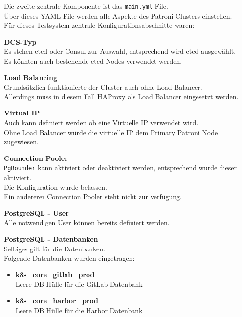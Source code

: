 \begin{flushleft}
    Die zweite zentrale Komponente ist das \texttt{main.yml}-File.\\
    Über dieses YAML-File werden alle Aspekte des Patroni-Clusters einstellen.\\
    Für dieses Testsystem zentrale Konfigurationsabschnitte waren:
    \begin{description}
        \item \textbf{\Gls{DCS}-Typ}\hfill \\Es stehen \gls{etcd} oder \Gls{Consul} zur Auswahl, entsprechend wird \gls{etcd} ausgewählt.\\Es könnten auch bestehende \gls{etcd}-Nodes verwendet werden.
        \item \textbf{Load Balancing}\hfill \\Grundsätzlich funktionierte der Cluster auch ohne Load Balancer.\\Allerdings muss in diesem Fall \Gls{HAProxy} als Load Balancer eingesetzt werden.
        \item \textbf{Virtual IP}\hfill \\Auch kann definiert werden ob eine Virtuelle IP verwendet wird.\\Ohne Load Balancer würde die virtuelle IP dem Primary Patroni Node zugewiesen.
        \item \textbf{\Gls{Connection Pooler}}\hfill \\\texttt{PgBounder} kann aktiviert oder deaktiviert werden, entsprechend wurde dieser aktiviert.\\Die Konfiguration wurde belassen.\\Ein andererer \Gls{Connection Pooler} steht nicht zur verfügung.
        \item \textbf{PostgreSQL - User}\hfill \\Alle notwendigen User können bereits definiert werden.
        \item \textbf{PostgreSQL - Datenbanken}\hfill \\Selbiges gilt für die Datenbanken.\\Folgende Datenbanken wurden eingetragen:
        \begin{itemize}
            \item \textbf{k8s\_core\_gitlab\_prod}\hfill \\Leere DB Hülle für die \Gls{GitLab} Datenbank
            \item \textbf{k8s\_core\_harbor\_prod}\hfill \\Leere DB Hülle für die \Gls{Harbor} Datenbank

\end{itemize}
\end{description}
\end{flushleft}
